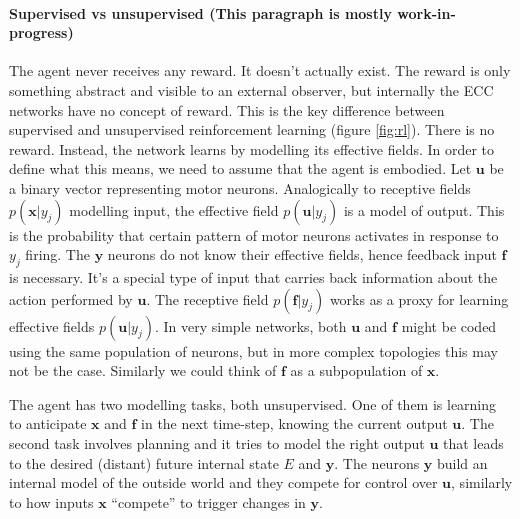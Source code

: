 \documentclass[12pt]{article}
\begin{document}
\paragraph{Supervised vs unsupervised (This paragraph is mostly work-in-progress)}
The agent never receives any reward. It doesn't actually exist. The reward is only something abstract and visible to an external observer, but internally the ECC networks have no concept of reward. This is the key difference between supervised and unsupervised reinforcement learning (figure \ref{fig:rl}). There is no reward. Instead, the network learns by modelling its effective fields. In order to define what this means, we need to assume that the agent is embodied. Let $\boldsymbol{u}$ be a binary vector representing motor neurons.
Analogically to receptive fields $p(\boldsymbol{x}|y_j)$ modelling input, the effective field
$p(\boldsymbol{u}|y_j)$ is a model of output. This is the probability that certain pattern of motor neurons activates in response to $y_j$ firing. The $\boldsymbol{y}$ neurons do not know their effective fields, hence feedback input $\boldsymbol{f}$ is necessary. It's a special type of input that carries back information about the action performed by $\boldsymbol{u}$. The receptive field $p(\boldsymbol{f}|y_j)$ works as a proxy for learning effective fields $p(\boldsymbol{u}|y_j)$. In very simple networks, both $\boldsymbol{u}$ and $\boldsymbol{f}$ might be coded using the same population of neurons, but in more complex topologies this may not be the case. Similarly we could think of $\boldsymbol{f}$ as a subpopulation of $\boldsymbol{x}$. 

The agent has two modelling tasks, both unsupervised. One of them is learning to anticipate $\boldsymbol{x}$ and $\boldsymbol{f}$ in the next time-step, knowing the current output $\boldsymbol{u}$. The second task involves planning and it tries to model the right output $\boldsymbol{u}$ that leads to the desired (distant) future internal state $E$ and $\boldsymbol{y}$. The neurons $\boldsymbol{y}$ build an internal model of the outside world and they compete for control over $\boldsymbol{u}$, similarly to how inputs $\boldsymbol{x}$ ``compete'' to trigger changes in $\boldsymbol{y}$.
\end{document}
